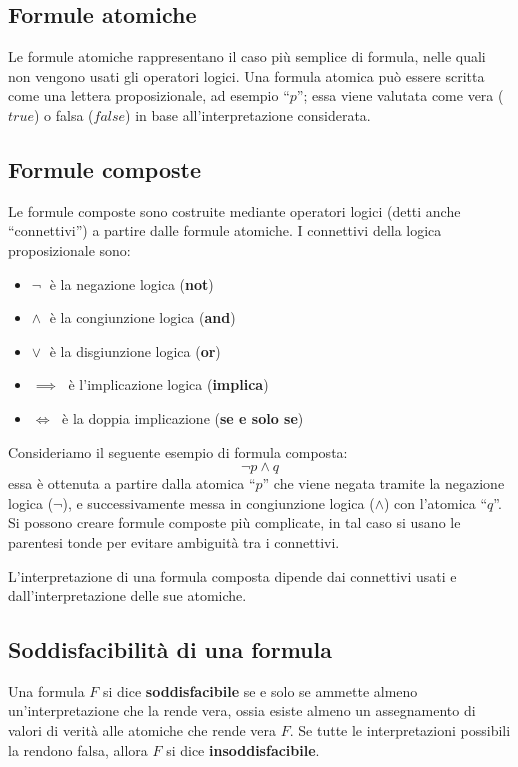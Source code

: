 \documentclass[a4paper,12pt]{report}
\begin{document}
\subsection{Formule atomiche}

Le formule atomiche rappresentano il caso più semplice di formula, nelle quali non vengono usati gli operatori logici. Una formula atomica può essere scritta come una lettera proposizionale, ad esempio ``$p$''; essa viene valutata come vera ($true$) o falsa ($false$) in base all'interpretazione considerata. 

\subsection{Formule composte}

Le formule composte sono costruite mediante operatori logici (detti anche ``connettivi'') a partire dalle formule atomiche. I connettivi della logica proposizionale sono:
\begin{itemize}
    \item $\lnot \;$ è la negazione logica (\textbf{not})
    \item $\land \;$ è la congiunzione logica (\textbf{and})
    \item $\lor \;$ è la disgiunzione logica (\textbf{or})
    \item $\implies \;$ è l'implicazione logica (\textbf{implica})
    \item $\iff \;$ è la doppia implicazione (\textbf{se e solo se})
\end{itemize}
Consideriamo il seguente esempio di formula composta: 
\[ \lnot p \land q\] essa è ottenuta a partire dalla atomica ``$p$'' che viene negata tramite la negazione logica ($\lnot$), e successivamente messa in congiunzione logica ($\land$) con l'atomica ``$q$''. 
Si possono creare formule composte più complicate, in tal caso si usano le parentesi tonde per evitare ambiguità tra i connettivi.

L'interpretazione di una formula composta dipende dai connettivi usati e dall'interpretazione delle sue atomiche.

\subsection{Soddisfacibilità di una formula}
Una formula $F$ si dice \textbf{soddisfacibile} se e solo se ammette almeno un'interpretazione che la rende vera, ossia esiste almeno un assegnamento di valori di verità alle atomiche che rende vera $F$. Se tutte le interpretazioni possibili la rendono falsa, allora $F$ si dice \textbf{insoddisfacibile}.
\end{document}
